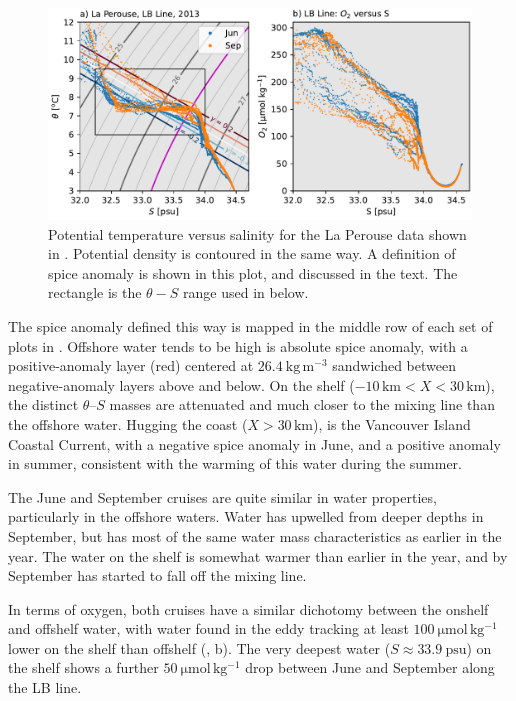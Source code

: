 \documentclass[draft]{agujournal2019}
\begin{document}
\begin{figure}[htbp]
  \begin{center}
     \includegraphics[width=5in]{LaPerouse2013TS}
     \caption{Potential temperature versus salinity for the La Perouse data shown in .  Potential density is contoured in the same way.  A definition of spice anomaly is shown in this plot, and discussed in the text.  The rectangle is the $\theta-S$ range used in  below.}
     \label{fig:LaPerouse2013TS}
  \end{center}
\end{figure}

The spice anomaly defined this way is mapped in the middle row of each set of plots in .  Offshore water tends to be high is absolute spice anomaly, with a positive-anomaly layer (red) centered at $26.4\ \mathrm{kg\,m^{-3}}$ sandwiched between negative-anomaly layers above and below.  On the shelf ($-10\, \mathrm{km} < X < 30\, \mathrm{km}$), the distinct $\theta$--$S$ masses are attenuated and much closer to the mixing line than the offshore water.  Hugging the coast ($X > 30\, \mathrm{km}$), is the Vancouver Island Coastal Current, with a negative spice anomaly in June, and a positive anomaly in summer, consistent with the warming of this water during the summer.

The June and September cruises are quite similar in water properties, particularly in the offshore waters.  Water has upwelled from deeper depths in September, but has most of the same water mass characteristics as earlier in the year.  The water on the shelf is somewhat warmer than earlier in the year, and by September has started to fall off the mixing line.

In terms of oxygen, both cruises have a similar dichotomy between the onshelf and offshelf water, with water found in the eddy tracking at least $100\ \mathrm{\mu mol\, kg^{-1}}$ lower on the shelf than offshelf (, b).  The very deepest water ($S\approx 33.9\ \mathrm{psu}$) on the shelf shows a further $50\ \mathrm{\mu mol\, kg^{-1}}$ drop between June and September along the LB line.
\end{document}
